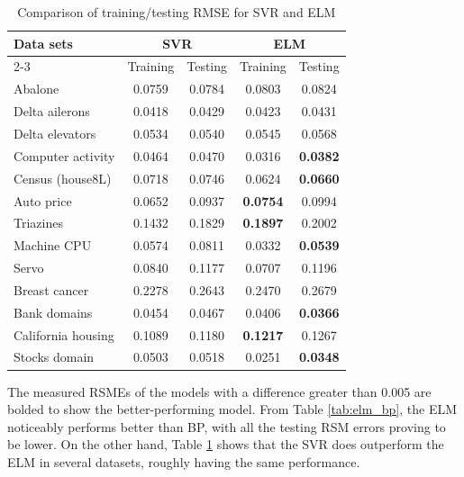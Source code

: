 \documentclass[12pt]{article}
\begin{document}
\begin{table}[h]
\centering
\caption{Comparison of training/testing RMSE for SVR and ELM}
\label{tab:elm_svr}
\begin{tabular}{@{}lcccc@{}}
\hline
\textbf{Data sets} & \multicolumn{2}{c}{\textbf{SVR}} & \multicolumn{2}{c}{\textbf{ELM}} \\
\cline{2-3} \cline{4-5}
 & Training & Testing & Training & Testing \\
\hline
Abalone & 0.0759 & 0.0784 & 0.0803 & 0.0824 \\
Delta ailerons & 0.0418 & 0.0429 & 0.0423 & 0.0431 \\
Delta elevators & 0.0534 & 0.0540 & 0.0545 & 0.0568 \\
Computer activity & 0.0464 & 0.0470 & 0.0316 & \textbf{0.0382} \\
Census (house8L) & 0.0718 & 0.0746 & 0.0624 & \textbf{0.0660} \\
Auto price & 0.0652 & 0.0937 & \textbf{0.0754} & 0.0994 \\
Triazines & 0.1432 & 0.1829 & \textbf{0.1897} & 0.2002 \\
Machine CPU & 0.0574 & 0.0811 & 0.0332 & \textbf{0.0539} \\
Servo & 0.0840 & 0.1177 & 0.0707 & 0.1196 \\
Breast cancer & 0.2278 & 0.2643 & 0.2470 & 0.2679 \\
Bank domains & 0.0454 & 0.0467 & 0.0406 & \textbf{0.0366} \\
California housing & 0.1089 & 0.1180 & \textbf{0.1217} & 0.1267 \\
Stocks domain & 0.0503 & 0.0518 & 0.0251 & \textbf{0.0348} \\
\hline
\end{tabular}
\end{table}

The measured RSMEs of the models with a difference greater than 0.005 are bolded to show the better-performing model. From Table \ref{tab:elm_bp}, the ELM noticeably performs better than BP, with all the testing RSM errors proving to be lower. On the other hand, Table \ref{tab:elm_svr} shows that the SVR does outperform the ELM in several datasets, roughly having the same performance.
\end{document}

